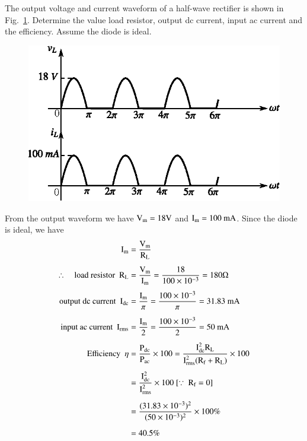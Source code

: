 \begin{problem}\label{prob1.8}
The output voltage and current waveform of a half-wave rectifier is shown in Fig.~\ref{fig1.31}. Determine the value load resistor, output dc current, input ac current and the efficiency. Assume the diode is ideal.
\begin{figure}[H]
\centering
\includegraphics{chap1/fig1.31.eps}
\caption{}\label{fig1.31}
\end{figure}
\end{problem}

\begin{solution}
From the output waveform we have $\textrm{V}_{\textrm{m}}=18\textrm{V}$ and $\textrm{I}_{\textrm{m}}=100\text{~mA}$. Since the diode is ideal, we have
\begin{align*}
\textrm{I}_{\textrm{m}} &= \frac{\textrm{V}_{\textrm{m}}}{\textrm{R}_{\textrm{L}}}\\[5pt]
\therefore\quad \text{load resistor~ } \textrm{R}_{\textrm{L}} &= \frac{\textrm{V}_{\textrm{m}}}{\textrm{I}_{\textrm{m}}}=\frac{18}{100\times 10^{-3}}=180\Omega\\[4pt]
\text{output dc current~ } \textrm{I}_{\text{dc}} &= \frac{\textrm{I}_{\textrm{m}}}{\pi}=\dfrac{100\times 10^{-3}}{\pi}=31.83\text{~mA}\\[5pt]
\text{input ac current~ } \textrm{I}_{\text{rms}} &= \frac{\textrm{I}_{\textrm{m}}}{2}=\frac{100\times 10^{-3}}{2}=50\text{~mA}\\[5pt]
\text{Efficiency~ } \eta &= \frac{\textrm{P}_{\text{dc}}}{\textrm{P}_{\text{ac}}}\times 100=\frac{\textrm{I}^{2}_{\text{dc}}\textrm{R}_{\textrm{L}}}{\textrm{I}_{\text{rms}}^{2}(\textrm{R}_{\textrm{f}}+\textrm{R}_{\textrm{L}})}\times 100\\[4pt]
&=\frac{\textrm{I}^{2}_{\text{dc}}}{\textrm{I}^{2}_{\text{rms}}}\times 100 \ [\because \ \textrm{R}_{\textrm{f}}=0]\\[5pt]
&= \frac{(31.83\times 10^{-3})^{2}}{(50\times 10^{-3})^{2}}\times 100\%\\[5pt]
&= 40.5\%
\end{align*}
\end{solution}

